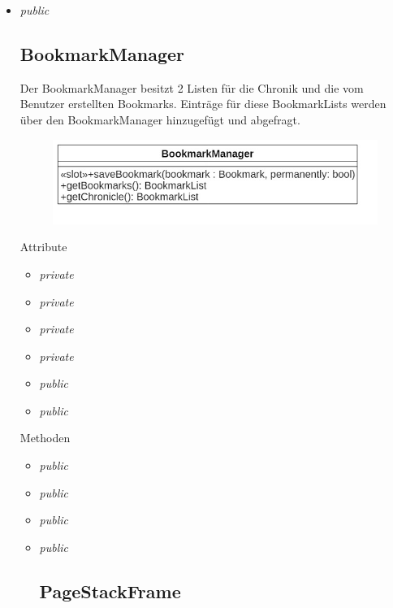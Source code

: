 \begin{itemize}
\begin{itemize}
\begin{itemize}
	\item\textit{public }

\subsection*{BookmarkManager}
Der BookmarkManager besitzt 2 Listen für die Chronik und die vom Benutzer erstellten Bookmarks. Einträge für diese BookmarkLists werden über den BookmarkManager hinzugefügt und abgefragt.

\begin{figure}[H]
\centering
\includegraphics[scale=0.5]{img/Klassendiagramm/Klassen/Controller/BookmarkManager}
\label{fig:bookmarkManager}
\end{figure}

Attribute
\begin{itemize}
	\item\textit{private }
	
	\item\textit{private }
	
	\item\textit{private }
	
	\item\textit{private }
	
	\item\textit{public }  
	
	\item\textit{public }
	
\end{itemize}

Methoden
\begin{itemize}
	\item\textit{public }
	
	\item\textit{public }
	
	\item\textit{public }
	
	\item\textit{public }

\subsection*{PageStackFrame}


\end{itemize}
\end{itemize}
\end{itemize}
\end{itemize}
